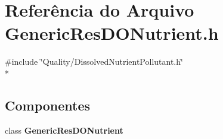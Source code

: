 \section{Referência do Arquivo Generic\+Res\+D\+O\+Nutrient.\+h}
\label{_generic_res_d_o_nutrient_8h}
{\ttfamily \#include \char`\"{}Quality/\+Dissolved\+Nutrient\+Pollutant.\+h\char`\"{}}\\*
\subsection*{Componentes}
\begin{DoxyCompactItemize}
\item 
class {\bf Generic\+Res\+D\+O\+Nutrient}
\end{DoxyCompactItemize}

